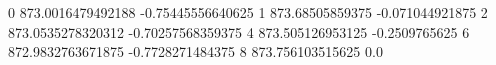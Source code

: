0 873.0016479492188 -0.75445556640625
1 873.68505859375 -0.071044921875
2 873.0535278320312 -0.70257568359375
4 873.505126953125 -0.2509765625
6 872.9832763671875 -0.7728271484375
8 873.756103515625 0.0
